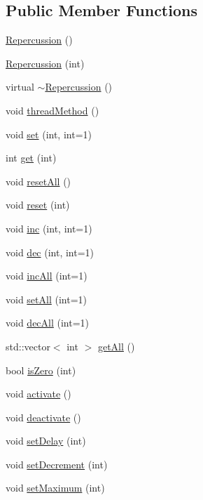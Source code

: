 \subsection*{Public Member Functions}
\begin{DoxyCompactItemize}
\item 
\hyperlink{classRepercussion_aa00feedc0ca2b0b3f75e799cd4dc4dac}{Repercussion} ()
\item 
\hyperlink{classRepercussion_a5a89f900156f4074a3d569fe48b11f1d}{Repercussion} (int)
\item 
virtual \hyperlink{classRepercussion_ad32730687e044c8d774dfb995af2f5a8}{$\sim$Repercussion} ()
\item 
void \hyperlink{classRepercussion_a903a946946c3393ea3a063d594e0fb91}{threadMethod} ()
\item 
void \hyperlink{classRepercussion_a27ded768fd7b386d8530dae787c46911}{set} (int, int=1)
\item 
int \hyperlink{classRepercussion_a1841959db6918b0bacdd436ef56b8313}{get} (int)
\item 
void \hyperlink{classRepercussion_ad119f81fef26097425bed1cad45dcaa9}{resetAll} ()
\item 
void \hyperlink{classRepercussion_a5677645d06730a42d44b2b69e6e1cac2}{reset} (int)
\item 
void \hyperlink{classRepercussion_aaa27e3c9251d0dda1c24ac77421bdaab}{inc} (int, int=1)
\item 
void \hyperlink{classRepercussion_ac86fbba0711b097da755b6a7280eef63}{dec} (int, int=1)
\item 
void \hyperlink{classRepercussion_afece2a141e05cceea3dff10b7d67c63e}{incAll} (int=1)
\item 
void \hyperlink{classRepercussion_ad825c06913e11c2617f38ee4421f237a}{setAll} (int=1)
\item 
void \hyperlink{classRepercussion_a87bb91156e63992084f6011b32acab8c}{decAll} (int=1)
\item 
std::vector$<$ int $>$ \hyperlink{classRepercussion_af2d97e8c5795fb6df793e0f17dd4831d}{getAll} ()
\item 
bool \hyperlink{classRepercussion_a95fc77c0adf534f0ce92a48a23bdaece}{isZero} (int)
\item 
void \hyperlink{classRepercussion_a19b9c3950397311c5f275fce451df5f6}{activate} ()
\item 
void \hyperlink{classRepercussion_a0d1bcb6ab372efecb912006e038f2bd5}{deactivate} ()
\item 
void \hyperlink{classRepercussion_a046c98f4950c6f484cb5d07c5f295e23}{setDelay} (int)
\item 
void \hyperlink{classRepercussion_a66219691fbf748e8751cf1c447347683}{setDecrement} (int)
\item 
void \hyperlink{classRepercussion_a8f4c193ca2406c92ebff923218c2e328}{setMaximum} (int)
\end{DoxyCompactItemize}


